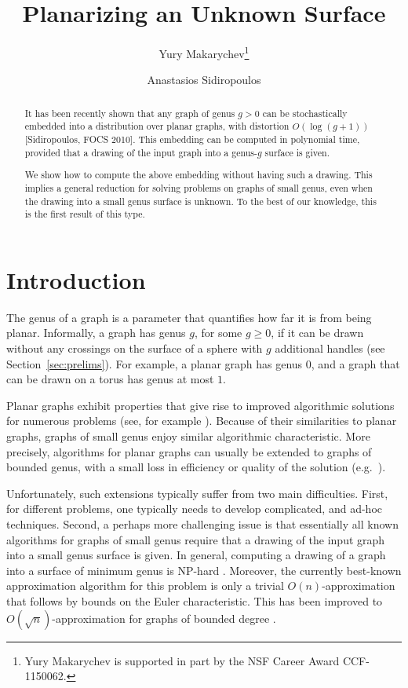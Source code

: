 \documentclass[envcountsect]{llncs}
\title{Planarizing an Unknown Surface}
\author{Yury Makarychev\thanks{Yury Makarychev is supported in part by the NSF Career Award CCF-1150062.}
\and Anastasios Sidiropoulos}
\institute{Toyota Technological Institute at Chicago\\
\url{yury@ttic.edu, tasos@ttic.edu}}
\begin{document}
\maketitle

\begin{abstract}
It has been recently shown that any graph of genus $g>0$ can be stochastically embedded into a distribution over planar graphs, with distortion $O(\log (g+1))$ [Sidiropoulos, FOCS 2010]. This embedding can be computed in polynomial time, provided that a drawing of the input graph into a genus-$g$ surface is given.

We show how to compute the above embedding without having such a drawing.
This implies a general reduction for solving problems on graphs of small genus, even when the drawing into a small genus surface is unknown.
To the best of our knowledge, this is the first result of this type.
\end{abstract}



\section{Introduction}

The genus of a graph is a parameter that quantifies how far it is from being planar.
Informally, a graph has genus $g$, for some
$g\geq 0$, if it can be drawn without any crossings on the surface of
a sphere with $g$ additional handles (see Section~\ref{sec:prelims}).  For example, a planar graph has genus $0$, and a
graph that can be drawn on a torus has genus at most $1$.

Planar graphs exhibit properties that give rise to improved algorithmic solutions for numerous problems (see, for example \cite{Baker-planar}).
Because of their similarities to planar graphs, graphs
of small genus enjoy similar algorithmic characteristic.
More precisely, algorithms for planar graphs can usually be extended to graphs of bounded genus, with a small loss in efficiency or quality of the solution (e.g.~\cite{CEN09}).

Unfortunately, such extensions typically suffer from two main difficulties.
First, for different problems, one typically needs to develop complicated, and ad-hoc techniques.
Second, a perhaps more challenging issue is that essentially all known algorithms for graphs of small genus require that a drawing of the input graph into a small genus surface is given.
In general, computing a drawing of a graph into a surface of minimum genus is NP-hard \cite{Thomassen89,Thomassen93a}.
Moreover, the currently best-known approximation algorithm for this problem is only a trivial $O(n)$-approximation that follows by bounds on the Euler characteristic.
This has been improved to $O(\sqrt{n})$-approximation for graphs of bounded degree \cite{ChenKK97}.
\end{document}
